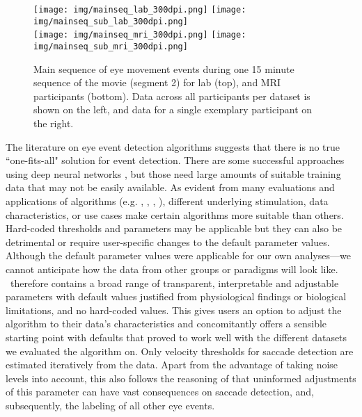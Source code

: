 \begin{figure*}[tbp]
  \texttt{[image: img/mainseq\_lab\_300dpi.png]}
  \texttt{[image: img/mainseq\_sub\_lab\_300dpi.png]} \\
  \texttt{[image: img/mainseq\_mri\_300dpi.png]}
  \texttt{[image: img/mainseq\_sub\_mri\_300dpi.png]}

  \caption{Main sequence of eye movement events during one 15 minute sequence of
  the movie (segment 2) for lab (top), and MRI participants (bottom). Data
  across all participants per dataset is shown on the left, and data for a single
  exemplary participant on the right.}

  \label{fig:overallComp}
\end{figure*}


The literature on eye event detection algorithms suggests that there is no true
``one-fits-all" solution for event detection.  There are some successful
approaches using deep neural networks \citep{Startsev2018}, but those need large amounts of suitable training data that may not be easily
available.
As evident from many evaluations and applications of algorithms (e.g.
\cite{Andersson2017}, \cite{Larsson2013}, \cite{Zemblys2018}, \cite{5523936}),
different underlying stimulation, data characteristics, or use cases make
certain algorithms more suitable than others. Hard-coded thresholds and
parameters may be applicable but they can also be detrimental or require user-specific changes to
the default parameter values. Although the default parameter
values were applicable for our own analyses---we cannot anticipate how the data from other
groups or paradigms will look like.  \remodnav\ therefore contains a broad range of
transparent, interpretable and adjustable parameters with default values
justified from physiological findings or biological limitations, and no
hard-coded values. This gives users an option to adjust the algorithm to their
data's characteristics and concomitantly offers a sensible starting point with defaults that
proved to work well with the different datasets we evaluated the algorithm on.
Only velocity thresholds for saccade detection are estimated iteratively from
the data. Apart from the advantage of taking noise levels into account, this
also follows the reasoning of \cite{Nystrom2010AnData} that uninformed
adjustments of this parameter can have vast consequences on saccade detection,
and, subsequently, the labeling of all other eye events.


